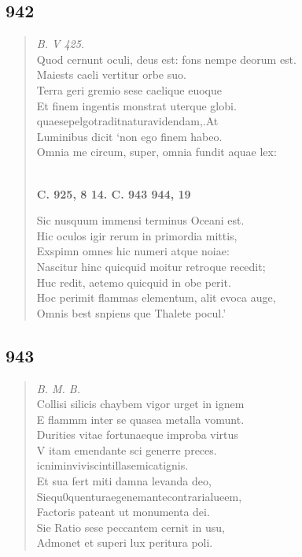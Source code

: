 \documentclass[11pt, a4paper]{report}
\begin{document}
            \subsection*{942}
      \begin{verse}
      \textit{B. V 425.} \\ Quod cernunt oculi, deus est: fons nempe deorum est. \\ Maiests caeli vertitur orbe suo. \\ Terra geri gremio sese caelique euoque \\ Et finem ingentis monstrat uterque globi. \\ quaesepelgotraditnaturavidendam,.At \\ Luminibus dicit ‘non ego finem habeo. \\ Omnia me circum, super, omnia fundit aquae lex: \\ 
        ﻿\pagebreak 
     \marginpar{[365]} \begin{center} \textbf{C. 925, 8 14. C. 943 944, 19} \end{center}Sic nusquum immensi terminus Oceani est. \\ Hic oculos igir rerum in primordia mittis, \\ Exspimn omnes hic numeri atque noiae: \\ Nascitur hinc quicquid moitur retroque recedit; \\ Huc redit, aetemo quicquid in obe perit. \\ Hoc perimit flammas elementum, alit evoca auge, \\ Omnis best snpiens que Thalete pocul.’ \\ 
      \end{verse}
  
            \subsection*{943}
      \begin{verse}
      \textit{B. M. B.} \\ Collisi silicis chaybem vigor urget in ignem \\ E flammm inter se quasea metalla vomunt. \\ Durities vitae fortunaeque improba virtus \\ V itam emendante sci generre preces. \\ icniminviviscintillasemicatignis. \\ Et sua fert miti damna levanda deo, \\ Siequ0quenturaegenemantecontrarialueem, \\ Factoris pateant ut monumenta dei. \\ Sie Ratio sese peccantem cernit in usu, \\ Admonet et superi lux peritura poli. \\ 
      \end{verse}
  
\end{document}

